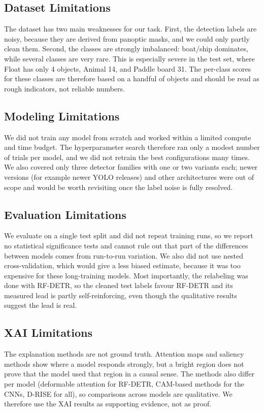 \documentclass[11pt,a4paper]{article}
\begin{document}
\subsection{Dataset Limitations}
The dataset has two main weaknesses for our task. First, the detection labels are
noisy, because they are derived from panoptic masks, and we could only partly
clean them. Second, the classes are strongly imbalanced: boat/ship dominates,
while several classes are very rare. This is especially severe in the test set,
where Float has only 4 objects, Animal 14, and Paddle board 31. The per-class
scores for these classes are therefore based on a handful of objects and should be
read as rough indicators, not reliable numbers.

\subsection{Modeling Limitations}
We did not train any model from scratch and worked within a limited compute and
time budget. The hyperparameter search therefore ran only a modest number of
trials per model, and we did not retrain the best configurations many times. We
also covered only three detector families with one or two variants each; newer
versions (for example newer YOLO releases) and other architectures were out of
scope and would be worth revisiting once the label noise is fully resolved.

\subsection{Evaluation Limitations}
We evaluate on a single test split and did not repeat training runs, so we report
no statistical significance tests and cannot rule out that part of the differences
between models comes from run-to-run variation. We also did not use nested
cross-validation, which would give a less biased estimate, because it was too
expensive for these long-training models. Most importantly, the relabeling was
done with RF-DETR, so the cleaned test labels favour RF-DETR and its measured lead
is partly self-reinforcing, even though the qualitative results suggest the lead
is real.

\subsection{XAI Limitations}
The explanation methods are not ground truth. Attention maps and saliency methods
show where a model responds strongly, but a bright region does not prove that the
model used that region in a causal sense. The methods also differ per model
(deformable attention for RF-DETR, CAM-based methods for the CNNs, D-RISE for
all), so comparisons across models are qualitative. We therefore use the XAI
results as supporting evidence, not as proof.
\end{document}
